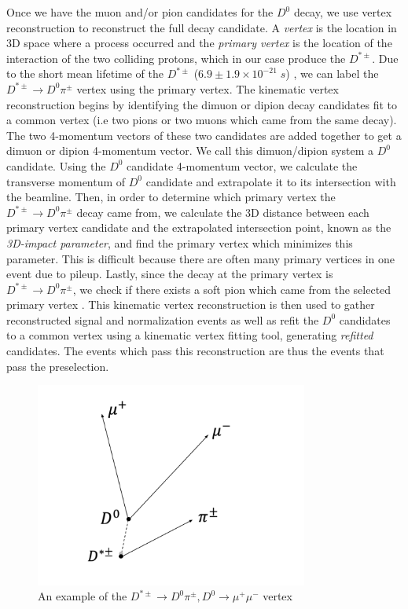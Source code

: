 Once we have the muon and/or pion candidates for the $D^0$ decay, we use vertex reconstruction to reconstruct the full decay candidate. A \textit{vertex} is the location in 3D space where a process occurred and the \textit{primary vertex} is the location of the interaction of the two colliding protons, which in our case produce the $D^{*\pm}$. Due to the short mean lifetime of the $D^{*\pm}$ ($ 6.9 \pm 1.9 \times 10^{-21} \; s$) \cite{ref:pdg2024}, we can label the $D^{*\pm} \to D^0 \pi^\pm$ vertex using the primary vertex. The kinematic vertex reconstruction begins by identifying the dimuon or dipion decay candidates fit to a common vertex (i.e two pions or two muons which came from the same decay). The two 4-momentum vectors of these two candidates are added together to get a dimuon or dipion 4-momentum vector. We call this dimuon/dipion system a $D^0$ candidate. Using the $D^0$ candidate 4-momentum vector, we calculate the transverse momentum of $D^0$ candidate and extrapolate it to its intersection with the beamline. Then, in order to determine which primary vertex the $D^{*\pm} \to D^0 \pi^\pm$ decay came from, we calculate the 3D distance between each primary vertex candidate and the extrapolated intersection point, known as the \textit{3D-impact parameter}, and find the primary vertex which minimizes this parameter. This is difficult because there are often many primary vertices in one event due to pileup. Lastly, since the decay at the primary vertex is $D^{*\pm} \to D^0 \pi^\pm$, we check if there exists a soft pion which came from the selected primary vertex \cite{ref:Prokofiev_Speer_2005}. This kinematic vertex reconstruction is then used to gather reconstructed signal and normalization events as well as refit the $D^0$ candidates to a common vertex using a kinematic vertex fitting tool, generating \textit{refitted} candidates. The events which pass this reconstruction are thus the events that pass the preselection. 

\begin{figure}[htbp]
    \centering
    \includegraphics[width=0.8\textwidth]{figures/chapter4/vertex_reconstruction.png}
    \caption{An example of the $D^{*\pm} \to D^0 \pi^\pm, D^0 \to \mu^+ \mu^-$ vertex}
    \label{fig:vertex_reconstruction}
\end{figure}

